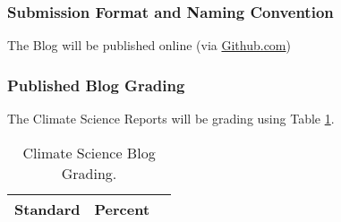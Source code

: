 \subsubsection{Submission Format and Naming Convention}

The Blog will be published online (via \url{Github.com}) 

\subsubsection{Published Blog Grading}

The Climate Science Reports will be grading using Table \ref{tab:bloggrading}. 

\begin{table}[h]
\caption{Climate Science Blog Grading.}
\label{tab:bloggrading}
\begin{tabular}{lll}\hline
Standard      &   Percent   & \\ \hline\hline
\hline
\end{tabular}
\end{table}

